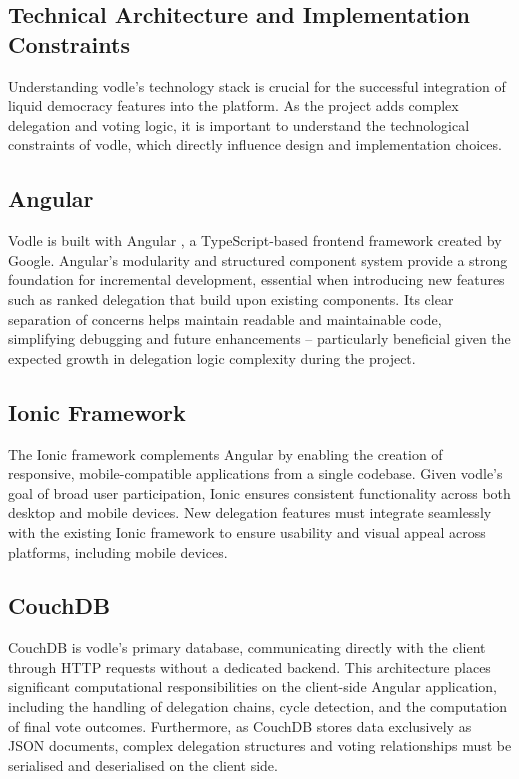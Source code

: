 \subsection{Technical Architecture and Implementation Constraints}
Understanding vodle's technology stack is crucial for the successful integration of liquid democracy features into the platform. As the project adds complex delegation and voting logic, it is important to understand the technological constraints of vodle, which directly influence design and implementation choices.

\subsection*{Angular}
Vodle is built with Angular \citep{angular}, a TypeScript-based frontend framework created by Google. Angular's modularity and structured component system provide a strong foundation for incremental development, essential when introducing new features such as ranked delegation that build upon existing components. Its clear separation of concerns helps maintain readable and maintainable code, simplifying debugging and future enhancements -- particularly beneficial given the expected growth in delegation logic complexity during the project.

\subsection*{Ionic Framework}
The Ionic \citep{ionic} framework complements Angular by enabling the creation of responsive, mobile-compatible applications from a single codebase. Given vodle's goal of broad user participation, Ionic ensures consistent functionality across both desktop and mobile devices. %
New delegation features must integrate seamlessly with the existing Ionic framework to ensure usability and visual appeal across platforms, including mobile devices.

\subsection*{CouchDB}
CouchDB \citep{couchdb} is vodle's primary database, communicating directly with the client through HTTP requests without a dedicated backend. This architecture places significant computational responsibilities on the client-side Angular application, including the handling of delegation chains, cycle detection, and the computation of final vote outcomes. Furthermore, as CouchDB stores data exclusively as JSON documents, complex delegation structures and voting relationships must be serialised and deserialised on the client side.

